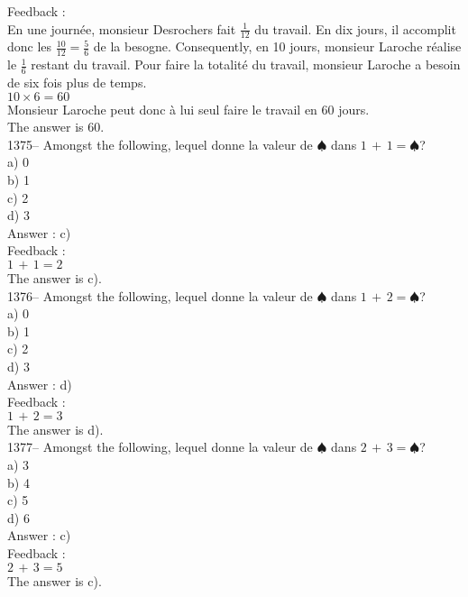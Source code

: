 ﻿\documentclass[letterpaper, 12pt]{article}
\begin{document}
Feedback : \\
En une journ\'ee, monsieur Desrochers fait $\frac{1}{12}$ du travail.  En
dix jours, il accomplit donc les $\frac{10}{12}=\frac{5}{6}$ de la besogne.
Consequently, en 10 jours, monsieur Laroche r\'ealise le $\frac{1}{6}$
restant du travail.  Pour faire la totalit\'e du travail, monsieur Laroche a
besoin de six fois plus de temps.\\
$10\times6=60$\\
Monsieur Laroche peut donc \`a lui seul faire le travail en 60 jours.  \\
The answer is 60.\\



1375-- Amongst the following, lequel donne la valeur de
$\spadesuit$ dans $1\,+\,1=\spadesuit$?\\
a) 0\\
b) 1\\
c) 2\\
d) 3\\

Answer : c)\\

Feedback : \\
$1\,+\,1=2$\\
The answer is c).\\

1376-- Amongst the following, lequel donne la valeur de
$\spadesuit$ dans $1\,+\,2=\spadesuit$?\\
a) 0\\
b) 1\\
c) 2\\
d) 3\\

Answer : d)\\

Feedback : \\
$1\,+\,2=3$\\
The answer is d).\\

1377-- Amongst the following, lequel donne la valeur de
$\spadesuit$ dans $2\,+\,3=\spadesuit$?\\
a) 3\\
b) 4\\
c) 5\\
d) 6\\

Answer : c)\\

Feedback : \\
$2\,+\,3=5$\\
The answer is c).\\
\end{document}
